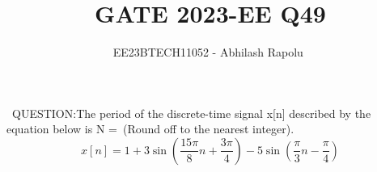 \documentclass[journal,12pt,twocolumn]{IEEEtran}
\title{GATE 2023-EE Q49}
\author{EE23BTECH11052 - Abhilash Rapolu $^{}$%
}
\begin{document}
\maketitle
\newpage
\bigskip
\ QUESTION:The period of the discrete-time signal x[n] described by the equation below is N =\ (Round off to the nearest integer).
$$x[n] = 1 + 3\sin\left(\frac{15\pi}{8}n + \frac{3\pi}{4}\right) - 5\sin\left(\frac{\pi}{3}n - \frac{\pi}{4}\right)$$
\end{document}
